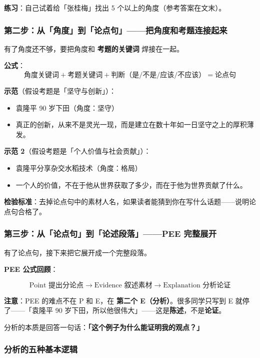\textbf{练习}：自己试着给「张桂梅」找出 5 个以上的角度（参考答案在文末）。

\subsubsection{第二步：从「角度」到「论点句」——把角度和考题连接起来}

有了角度还不够，要把角度和 \textbf{考题的关键词} 焊接在一起。

\textbf{公式}：
\[
\text{角度关键词} + \text{考题关键词} + \text{判断（是/不是/应该/不应该）} = \text{论点句}
\]

\textbf{示范}（假设考题是「坚守与创新」）：

\begin{itemize}
  \item[素材] 袁隆平 90 岁下田（角度：坚守）
  \item[论点句] 真正的创新，从来不是灵光一现，而是建立在数十年如一日坚守之上的厚积薄发。
\end{itemize}

\textbf{示范 2}（假设考题是「个人价值与社会贡献」）：

\begin{itemize}
  \item[素材] 袁隆平分享杂交水稻技术（角度：格局）
  \item[论点句] 一个人的价值，不在于他从世界获取了多少，而在于他为世界贡献了什么。
\end{itemize}

\textbf{检验标准}：去掉论点句中的素材人名，如果读者能猜到你在写什么话题——说明论点句合格了。

\subsubsection{第三步：从「论点句」到「论述段落」——PEE 完整展开}

有了论点句，接下来把它展开成一个完整段落。

\textbf{PEE 公式回顾}：

\[
\boxed{\text{Point 提出分论点}} \to \boxed{\text{Evidence 叙述素材}} \to \boxed{\text{Explanation 分析论证}}
\]

\textbf{注意}：PEE 的难点不在 P 和 E，在 \textbf{第二个 E（分析）}。很多同学只写到 E 就停了——「袁隆平 90 岁下田，所以他很伟大」——这是\textbf{陈述}，不是\textbf{论证}。

分析的本质是回答一句话：\textbf{「这个例子为什么能证明我的观点？」}

\subsubsection{分析的五种基本逻辑}

